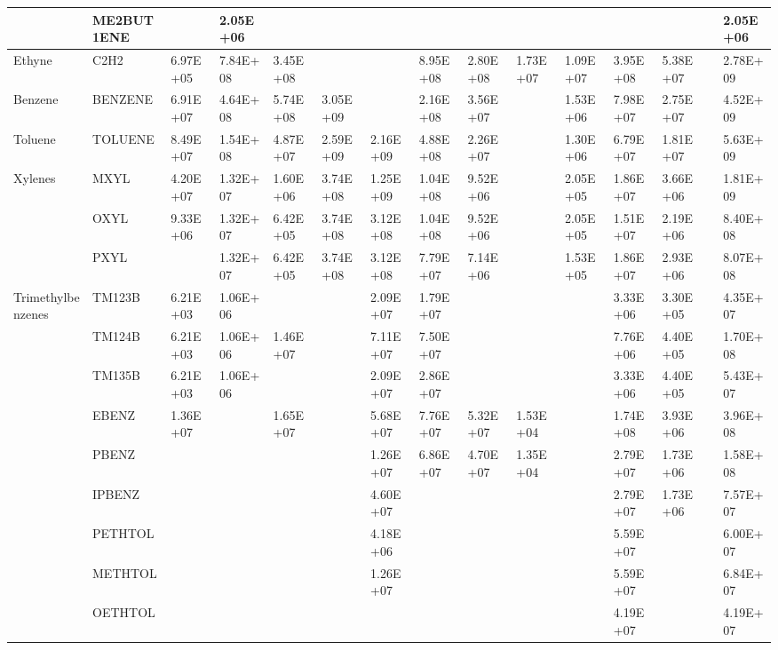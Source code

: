 \begin{longtable}{lllllllllllllll}
	 & ME2BUT1ENE &  & 2.05E+06 &  &  &  &  &  &  &  &  &  &  & 2.05E+06 \\
	\hline Ethyne & C2H2 & 6.97E+05 & 7.84E+08 & 3.45E+08 &  &  & 8.95E+08 & 2.80E+08 & 1.73E+07 & 1.09E+07 & 3.95E+08 & 5.38E+07 &  & 2.78E+09 \\ \hline
	Benzene & BENZENE & 6.91E+07 & 4.64E+08 & 5.74E+08 & 3.05E+09 &  & 2.16E+08 & 3.56E+07 &  & 1.53E+06 & 7.98E+07 & 2.75E+07 &  & 4.52E+09 \\
	\hline Toluene & TOLUENE & 8.49E+07 & 1.54E+08 & 4.87E+07 & 2.59E+09 & 2.16E+09 & 4.88E+08 & 2.26E+07 &  & 1.30E+06 & 6.79E+07 & 1.81E+07 &  & 5.63E+09 \\ \hline
	\multirow{3}{*}{Xylenes} & MXYL & 4.20E+07 & 1.32E+07 & 1.60E+06 & 3.74E+08 & 1.25E+09 & 1.04E+08 & 9.52E+06 &  & 2.05E+05 & 1.86E+07 & 3.66E+06 &  & 1.81E+09 \\
	 & OXYL & 9.33E+06 & 1.32E+07 & 6.42E+05 & 3.74E+08 & 3.12E+08 & 1.04E+08 & 9.52E+06 &  & 2.05E+05 & 1.51E+07 & 2.19E+06 &  & 8.40E+08 \\
	 & PXYL &  & 1.32E+07 & 6.42E+05 & 3.74E+08 & 3.12E+08 & 7.79E+07 & 7.14E+06 &  & 1.53E+05 & 1.86E+07 & 2.93E+06 &  & 8.07E+08 \\
	\hline \multirow{3}{*}{Trimethylbenzenes} & TM123B & 6.21E+03 & 1.06E+06 &  &  & 2.09E+07 & 1.79E+07 &  &  &  & 3.33E+06 & 3.30E+05 &  & 4.35E+07 \\
	 & TM124B & 6.21E+03 & 1.06E+06 & 1.46E+07 &  & 7.11E+07 & 7.50E+07 &  &  &  & 7.76E+06 & 4.40E+05 &  & 1.70E+08 \\
	 & TM135B & 6.21E+03 & 1.06E+06 &  &  & 2.09E+07 & 2.86E+07 &  &  &  & 3.33E+06 & 4.40E+05 &  & 5.43E+07 \\
	\hline \parbox[t]{2mm}{} & EBENZ & 1.36E+07 &  & 1.65E+07 &  & 5.68E+07 & 7.76E+07 & 5.32E+07 & 1.53E+04 &  & 1.74E+08 & 3.93E+06 &  & 3.96E+08 \\
	 & PBENZ &  &  &  &  & 1.26E+07 & 6.86E+07 & 4.70E+07 & 1.35E+04 &  & 2.79E+07 & 1.73E+06 &  & 1.58E+08 \\
	 & IPBENZ &  &  &  &  & 4.60E+07 &  &  &  &  & 2.79E+07 & 1.73E+06 &  & 7.57E+07 \\
	 & PETHTOL &  &  &  &  & 4.18E+06 &  &  &  &  & 5.59E+07 &  &  & 6.00E+07 \\
	 & METHTOL &  &  &  &  & 1.26E+07 &  &  &  &  & 5.59E+07 &  &  & 6.84E+07 \\
	 & OETHTOL &  &  &  &  &  &  &  &  &  & 4.19E+07 &  &  & 4.19E+07 \\

\end{longtable}
